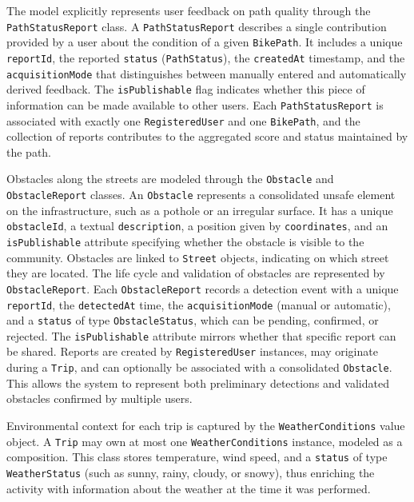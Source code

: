\par The model explicitly represents user feedback on path quality through the \texttt{PathStatusReport} class. A \texttt{PathStatusReport} describes a single contribution provided by a user about the condition of a given \texttt{BikePath}. It includes a unique \texttt{reportId}, the reported \texttt{status} (\texttt{PathStatus}), the \texttt{createdAt} timestamp, and the \texttt{acquisitionMode} that distinguishes between manually entered and automatically derived feedback. The \texttt{isPublishable} flag indicates whether this piece of information can be made available to other users. Each \texttt{PathStatusReport} is associated with exactly one \texttt{RegisteredUser} and one \texttt{BikePath}, and the collection of reports contributes to the aggregated score and status maintained by the path.

\par Obstacles along the streets are modeled through the \texttt{Obstacle} and \texttt{ObstacleReport} classes. An \texttt{Obstacle} represents a consolidated unsafe element on the infrastructure, such as a pothole or an irregular surface. It has a unique \texttt{obstacleId}, a textual \texttt{description}, a position given by \texttt{coordinates}, and an \texttt{isPublishable} attribute specifying whether the obstacle is visible to the community. Obstacles are linked to \texttt{Street} objects, indicating on which street they are located. The life cycle and validation of obstacles are represented by \texttt{ObstacleReport}. Each \texttt{ObstacleReport} records a detection event with a unique \texttt{reportId}, the \texttt{detectedAt} time, the \texttt{acquisitionMode} (manual or automatic), and a \texttt{status} of type \texttt{ObstacleStatus}, which can be pending, confirmed, or rejected. The \texttt{isPublishable} attribute mirrors whether that specific report can be shared. Reports are created by \texttt{RegisteredUser} instances, may originate during a \texttt{Trip}, and can optionally be associated with a consolidated \texttt{Obstacle}. This allows the system to represent both preliminary detections and validated obstacles confirmed by multiple users.

\par Environmental context for each trip is captured by the \texttt{WeatherConditions} value object. A \texttt{Trip} may own at most one \texttt{WeatherConditions} instance, modeled as a composition. This class stores temperature, wind speed, and a \texttt{status} of type \texttt{WeatherStatus} (such as sunny, rainy, cloudy, or snowy), thus enriching the activity with information about the weather at the time it was performed.

